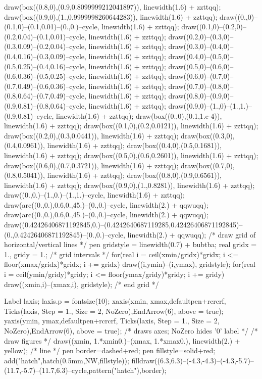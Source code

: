 draw(box((0.8,0),(0.9,0.8099999212041897)), linewidth(1.6) + zzttqq); 
draw(box((0.9,0),(1.,0.9999998260644283)), linewidth(1.6) + zzttqq); 
draw((0.,0)--(0.1,0)--(0.1,0.01)--(0.,0.)--cycle, linewidth(1.6) + zzttqq); 
draw((0.1,0)--(0.2,0)--(0.2,0.04)--(0.1,0.01)--cycle, linewidth(1.6) + zzttqq); 
draw((0.2,0)--(0.3,0)--(0.3,0.09)--(0.2,0.04)--cycle, linewidth(1.6) + zzttqq); 
draw((0.3,0)--(0.4,0)--(0.4,0.16)--(0.3,0.09)--cycle, linewidth(1.6) + zzttqq); 
draw((0.4,0)--(0.5,0)--(0.5,0.25)--(0.4,0.16)--cycle, linewidth(1.6) + zzttqq); 
draw((0.5,0)--(0.6,0)--(0.6,0.36)--(0.5,0.25)--cycle, linewidth(1.6) + zzttqq); 
draw((0.6,0)--(0.7,0)--(0.7,0.49)--(0.6,0.36)--cycle, linewidth(1.6) + zzttqq); 
draw((0.7,0)--(0.8,0)--(0.8,0.64)--(0.7,0.49)--cycle, linewidth(1.6) + zzttqq); 
draw((0.8,0)--(0.9,0)--(0.9,0.81)--(0.8,0.64)--cycle, linewidth(1.6) + zzttqq); 
draw((0.9,0)--(1.,0)--(1.,1.)--(0.9,0.81)--cycle, linewidth(1.6) + zzttqq); 
draw(box((0.,0),(0.1,1.e-4)), linewidth(1.6) + zzttqq); 
draw(box((0.1,0),(0.2,0.0121)), linewidth(1.6) + zzttqq); 
draw(box((0.2,0),(0.3,0.0441)), linewidth(1.6) + zzttqq); 
draw(box((0.3,0),(0.4,0.0961)), linewidth(1.6) + zzttqq); 
draw(box((0.4,0),(0.5,0.1681)), linewidth(1.6) + zzttqq); 
draw(box((0.5,0),(0.6,0.2601)), linewidth(1.6) + zzttqq); 
draw(box((0.6,0),(0.7,0.3721)), linewidth(1.6) + zzttqq); 
draw(box((0.7,0),(0.8,0.5041)), linewidth(1.6) + zzttqq); 
draw(box((0.8,0),(0.9,0.6561)), linewidth(1.6) + zzttqq); 
draw(box((0.9,0),(1.,0.8281)), linewidth(1.6) + zzttqq); 
draw((0.,0.)--(1.,0.)--(1.,1.)--cycle, linewidth(1.6) + zzttqq); 
draw(arc((0.,0.),0.6,0.,45.)--(0.,0.)--cycle, linewidth(2.) + qqwuqq); 
draw(arc((0.,0.),0.6,0.,45.)--(0.,0.)--cycle, linewidth(2.) + qqwuqq); 
draw((0.42426406871192845,0.)--(0.4242640687119285,0.42426406871192845)--(0.,0.42426406871192845)--(0.,0.)--cycle, linewidth(2.) + qqwuqq); 
 /* draw grid of horizontal/vertical lines */
pen gridstyle = linewidth(0.7) + bubtba; real gridx = 1., gridy = 1.; /* grid intervals */
for(real i = ceil(xmin/gridx)*gridx; i <= floor(xmax/gridx)*gridx; i += gridx)
 draw((i,ymin)--(i,ymax), gridstyle);
for(real i = ceil(ymin/gridy)*gridy; i <= floor(ymax/gridy)*gridy; i += gridy)
 draw((xmin,i)--(xmax,i), gridstyle);
 /* end grid */ 

Label laxis; laxis.p = fontsize(10); 
xaxis(xmin, xmax,defaultpen+rcrcrf, Ticks(laxis, Step = 1., Size = 2, NoZero),EndArrow(6), above = true); 
yaxis(ymin, ymax,defaultpen+rcrcrf, Ticks(laxis, Step = 1., Size = 2, NoZero),EndArrow(6), above = true); /* draws axes; NoZero hides '0' label */ 
 /* draw figures */
draw((xmin, 1.*xmin0.)--(xmax, 1.*xmax0.), linewidth(2.) + yellow); /* line */
pen border=dashed+red;
pen fillstyle=solid+red;
add("hatch",hatch(0.5mm,NW,fillstyle));
filldraw((6.3,6.3)--(-4.3,-4.3)--(-4.3,-5.7)--(11.7,-5.7)--(11.7,6.3)--cycle,pattern("hatch"),border);

